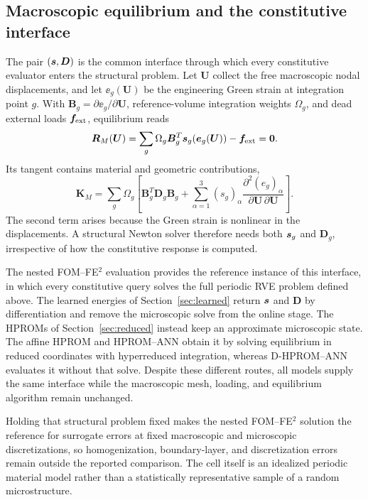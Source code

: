 \subsection{Macroscopic equilibrium and the constitutive interface}
The pair $(\bm s,\bm D)$ is the common interface through which every constitutive evaluator enters the structural problem. Let $\bm U$ collect the free macroscopic nodal displacements, and let $\ee_g(\bm U)$ be the engineering Green strain at integration point $g$. With $\bm B_g=\partial\ee_g/\partial\bm U$, reference-volume integration weights $\Omega_g$, and dead external loads $\bm f_{\rm ext}$, equilibrium reads
\begin{equation}
 \bm R_M(\bm U)=
       \sum_g\Omega_g\bm B_g^T\bm s_g(\bm e_g(\bm U))
       -\bm f_{\rm ext}=\bm0.
 \label{eq:macro_residual}
\end{equation}
Its tangent contains material and geometric contributions,
\begin{equation}
 \bm K_M=\sum_g\Omega_g\left[
      \bm B_g^T\bm D_g\bm B_g+
      \sum_{\alpha=1}^{3}(s_g)_\alpha
       \frac{\partial^2(e_g)_\alpha}{\partial\bm U\,\partial\bm U}
       \right].
 \label{eq:macro_tangent}
\end{equation}
The second term arises because the Green strain is nonlinear in the displacements. A structural Newton solver therefore needs both $\bm s_g$ and $\bm D_g$, irrespective of how the constitutive response is computed.

The nested FOM--FE$^2$ evaluation provides the reference instance of this interface, in which every constitutive query solves the full periodic RVE problem defined above. The learned energies of Section~\ref{sec:learned} return $\bm s$ and $\bm D$ by differentiation and remove the microscopic solve from the online stage. The HPROMs of Section~\ref{sec:reduced} instead keep an approximate microscopic state. The affine HPROM and HPROM--ANN obtain it by solving equilibrium in reduced coordinates with hyperreduced integration, whereas D-HPROM--ANN evaluates it without that solve. Despite these different routes, all models supply the same interface while the macroscopic mesh, loading, and equilibrium algorithm remain unchanged.

Holding that structural problem fixed makes the nested FOM--FE$^2$ solution the reference for surrogate errors at fixed macroscopic and microscopic discretizations, so homogenization, boundary-layer, and discretization errors remain outside the reported comparison. The cell itself is an idealized periodic material model rather than a statistically representative sample of a random microstructure.
